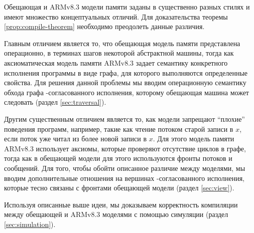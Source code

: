 Обещающая и ARMv8.3 модели памяти заданы в существенно разных стилях и имеют множество концептуальных отличий.
Для доказательства теоремы \ref{prop:compile-theorem} необходимо преодолеть данные различия.

Главным отличием является то, что обещающая модель памяти представлена операционно, в терминах
шагов некоторой абстрактной машины, тогда как аксиоматическая модель памяти ARMv8.3 задает семантику конкретного
исполнения программы в виде графа, для которого выполняются определенные свойства. 
Для решения данной проблемы мы вводим операционную семантику обхода графа \ARM-согласованного исполнения,
которому обещающая машина может следовать (раздел \ref{sec:traversal}).

Другим существенным отличием является то, как модели запрещают ``плохие'' поведения программ, например,
такие как чтение потоком старой записи в $x$, если поток уже читал из более новой записи в $x$.
Для этого модель памяти ARMv8.3 использует аксиомы, которые проверяют отсутствие циклов в графе, тогда
как в обещающей модели для этого используются фронты потоков и сообщений.
Для того, чтобы обойти описанное различие между моделями,
мы вводим дополнительные отношения на вершинах \ARM-согласованного исполнения,
которые тесно связаны с фронтами обещающей модели (раздел \ref{sec:view}).

Используя описанные выше идеи, мы доказываем корректность компиляции между обещающей и ARMv8.3 моделями
с помощью симуляции (раздел \ref{sec:simulation}).




